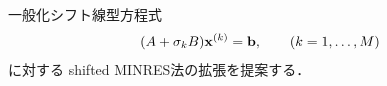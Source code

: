 

一般化シフト線型方程式
\begin{align}
	(A + \sigma_{k}B)\vb{x}^{(k)} = \vb{b}, \qquad (k=1,\dots,M)
\end{align}
に対する shifted MINRES法\cite{seito-sminres}の拡張を提案する．
